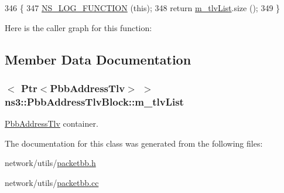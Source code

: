 \begin{DoxyCode}
346 \{
347   \hyperlink{log-macros-disabled_8h_a90b90d5bad1f39cb1b64923ea94c0761}{NS\_LOG\_FUNCTION} (\textcolor{keyword}{this});
348   \textcolor{keywordflow}{return} \hyperlink{classns3_1_1PbbAddressTlvBlock_a5b980e7869d03f502370180d866ba1ef}{m\_tlvList}.size ();
349 \}
\end{DoxyCode}


Here is the caller graph for this function\+:




\subsection{Member Data Documentation}
\subsubsection[{\texorpdfstring{m\+\_\+tlv\+List}{m_tlvList}}]{$<$ {\bf Ptr}$<${\bf Pbb\+Address\+Tlv}$>$ $>$ ns3\+::\+Pbb\+Address\+Tlv\+Block\+::m\+\_\+tlv\+List\hspace{0.3cm}{\ttfamily [private]}}\hypertarget{classns3_1_1PbbAddressTlvBlock_a5b980e7869d03f502370180d866ba1ef}{}\label{classns3_1_1PbbAddressTlvBlock_a5b980e7869d03f502370180d866ba1ef}


\hyperlink{classns3_1_1PbbAddressTlv}{Pbb\+Address\+Tlv} container. 



The documentation for this class was generated from the following files\+:\begin{DoxyCompactItemize}
\item 
network/utils/\hyperlink{packetbb_8h}{packetbb.\+h}\item 
network/utils/\hyperlink{packetbb_8cc}{packetbb.\+cc}\end{DoxyCompactItemize}

